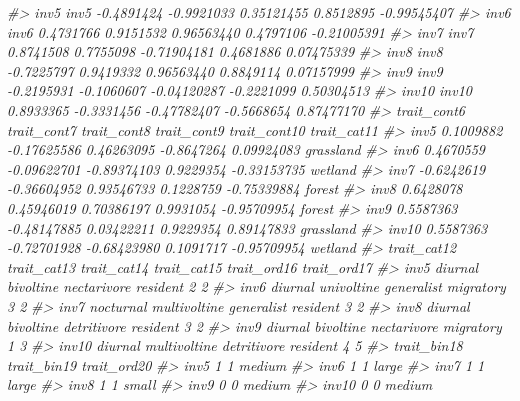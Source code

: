\documentclass[
]{article}
\newenvironment{Shaded}{\begin{snugshade}}{\end{snugshade}}
\newcommand{\CommentTok}[1]{\textcolor[rgb]{0.56,0.35,0.01}{\textit{#1}}}
\begin{document}
\begin{Shaded}
\begin{Highlighting}[]
\CommentTok{\#\textgreater{} inv5     inv5  {-}0.4891424  {-}0.9921033  0.35121455   0.8512895 {-}0.99545407}
\CommentTok{\#\textgreater{} inv6     inv6   0.4731766   0.9151532  0.96563440   0.4797106 {-}0.21005391}
\CommentTok{\#\textgreater{} inv7     inv7   0.8741508   0.7755098 {-}0.71904181   0.4681886  0.07475339}
\CommentTok{\#\textgreater{} inv8     inv8  {-}0.7225797   0.9419332  0.96563440   0.8849114  0.07157999}
\CommentTok{\#\textgreater{} inv9     inv9  {-}0.2195931  {-}0.1060607 {-}0.04120287  {-}0.2221099  0.50304513}
\CommentTok{\#\textgreater{} inv10   inv10   0.8933365  {-}0.3331456 {-}0.47782407  {-}0.5668654  0.87477170}
\CommentTok{\#\textgreater{}       trait\_cont6 trait\_cont7 trait\_cont8 trait\_cont9 trait\_cont10 trait\_cat11}
\CommentTok{\#\textgreater{} inv5    0.1009882 {-}0.17625586  0.46263095  {-}0.8647264   0.09924083   grassland}
\CommentTok{\#\textgreater{} inv6    0.4670559 {-}0.09622701 {-}0.89374103   0.9229354  {-}0.33153735     wetland}
\CommentTok{\#\textgreater{} inv7   {-}0.6242619 {-}0.36604952  0.93546733   0.1228759  {-}0.75339884      forest}
\CommentTok{\#\textgreater{} inv8    0.6428078  0.45946019  0.70386197   0.9931054  {-}0.95709954      forest}
\CommentTok{\#\textgreater{} inv9    0.5587363 {-}0.48147885  0.03422211   0.9229354   0.89147833   grassland}
\CommentTok{\#\textgreater{} inv10   0.5587363 {-}0.72701928 {-}0.68423980   0.1091717  {-}0.95709954     wetland}
\CommentTok{\#\textgreater{}       trait\_cat12  trait\_cat13 trait\_cat14 trait\_cat15 trait\_ord16 trait\_ord17}
\CommentTok{\#\textgreater{} inv5      diurnal    bivoltine nectarivore    resident           2           2}
\CommentTok{\#\textgreater{} inv6      diurnal   univoltine  generalist   migratory           3           2}
\CommentTok{\#\textgreater{} inv7    nocturnal multivoltine  generalist    resident           3           2}
\CommentTok{\#\textgreater{} inv8      diurnal    bivoltine detritivore    resident           3           2}
\CommentTok{\#\textgreater{} inv9      diurnal    bivoltine nectarivore   migratory           1           3}
\CommentTok{\#\textgreater{} inv10     diurnal multivoltine detritivore    resident           4           5}
\CommentTok{\#\textgreater{}       trait\_bin18 trait\_bin19 trait\_ord20}
\CommentTok{\#\textgreater{} inv5            1           1      medium}
\CommentTok{\#\textgreater{} inv6            1           1       large}
\CommentTok{\#\textgreater{} inv7            1           1       large}
\CommentTok{\#\textgreater{} inv8            1           1       small}
\CommentTok{\#\textgreater{} inv9            0           0      medium}
\CommentTok{\#\textgreater{} inv10           0           0      medium}


\end{Highlighting}
\end{Shaded}
\end{document}
